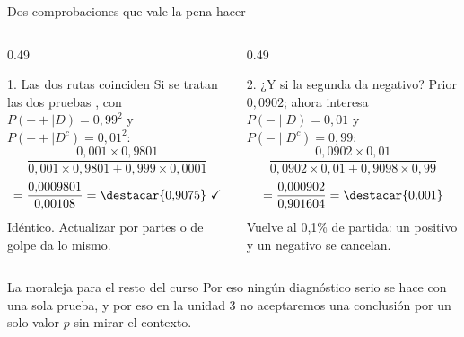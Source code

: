 \documentclass[aspectratio=169,10pt]{beamer}
\begin{document}
\begin{frame}{Dos comprobaciones que vale la pena hacer}
  \scriptsize
  \begin{columns}[T,onlytextwidth]
    \begin{column}{0.49\textwidth}
      \begin{exampleblock}{1. Las dos rutas coinciden}
        \tiny
        Si se tratan las dos pruebas , con
        $P(++\mid D) = 0{,}99^{2}$ y $P(++\mid D^{c}) = 0{,}01^{2}$:
        \[ \frac{0{,}001\times 0{,}9801}
                {0{,}001\times 0{,}9801 + 0{,}999\times 0{,}0001} \]
        \[ = \frac{0{,}0009801}{0{,}00108}
           = \destacar{0{,}9075} \ \checkmark \]
        {\color{uniGris}Idéntico. Actualizar por partes o de golpe da lo
        mismo.}
      \end{exampleblock}
    \end{column}
    \begin{column}{0.49\textwidth}
      \begin{alertblock}{2. ¿Y si la segunda da negativo?}
        \tiny
        Prior $0{,}0902$; ahora interesa $P(-\mid D)=0{,}01$ y
        $P(-\mid D^{c})=0{,}99$:
        \[ \frac{0{,}0902\times 0{,}01}
                {0{,}0902\times 0{,}01+0{,}9098\times 0{,}99} \]
        \[ = \frac{0{,}000902}{0{,}901604}
           = \destacar{0{,}001} \]
        {\color{uniGris}Vuelve  al 0,1\% de partida: un
        positivo y un negativo se cancelan.}
      \end{alertblock}
    \end{column}
  \end{columns}

  \vspace{0.08cm}
  \begin{block}{La moraleja para el resto del curso}
    \tiny
     Por eso ningún
    diagnóstico serio se hace con una sola prueba, y por eso en la unidad 3 no
    aceptaremos una conclusión por un solo valor $p$ sin mirar el contexto.
  \end{block}
\end{frame}
\end{document}
